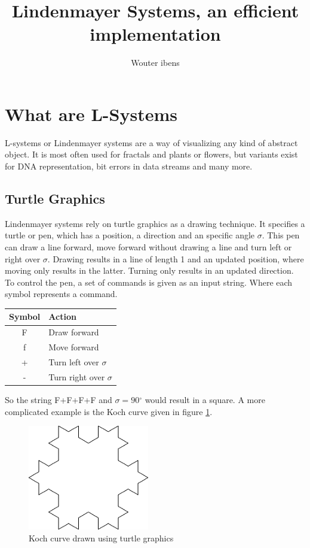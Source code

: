\documentclass[11pt,a4paper]{article}
\author{Wouter ibens}
\title{Lindenmayer Systems, an efficient implementation}
\newcommand{\degree}{\ensuremath{^\circ}}
\begin{document}
\maketitle
\tableofcontents
\newpage
\section{What are L-Systems}
L-systems or Lindenmayer systems are a way of visualizing any kind of abstract object. It is most often used for fractals and plants or flowers, but variants exist for DNA representation, bit errors in data streams and many more.

\subsection{Turtle Graphics}
Lindenmayer systems rely on turtle graphics as a drawing technique. It specifies a turtle or pen, which has a position, a direction and an specific angle $\sigma$. This pen can draw a line forward, move forward without drawing a line and turn left or right over $\sigma$. Drawing results in a line of length 1 and an updated position, where moving only results in the latter. Turning only results in an updated direction.
To control the pen, a set of commands is given as an input string. Where each symbol represents a command.
\begin{center}
\begin{tabular}{c | l}
Symbol & Action \\ \hline
F & Draw forward \\
f & Move forward \\
+ & Turn left over $\sigma$ \\
- & Turn right over $\sigma$
\end{tabular}
\end{center}

So the string F+F+F+F and $\sigma = 90\degree$ would result in a square. A more complicated example is the Koch curve given in figure \ref{fig:koch}.
\begin{figure}[h!]
  \centering
  \includegraphics[]{koch.png}
  \caption{Koch curve drawn using turtle graphics}
  \label{fig:koch}
\end{figure}
\end{document}
